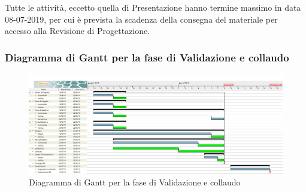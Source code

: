 Tutte le attività, eccetto quella di Presentazione hanno termine massimo in data 08-07-2019, per cui è prevista la scadenza della consegna del materiale per accesso alla Revisione di Progettazione.
\subsubsection{Diagramma di Gantt per la fase di Validazione e collaudo}

\begin{figure}[h!]
\begin{center}
  \includegraphics[scale=0.248]{immagini/ValidazioneGantt.png}
  \caption{Diagramma di Gantt per la fase di Validazione e collaudo}
  \end{center}
\end{figure}
